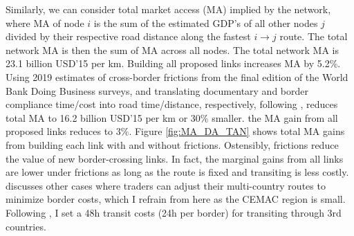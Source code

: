 \documentclass[a4paper]{article}
\begin{document}
Similarly, we can consider total market access (MA) implied by the network, where MA of node $i$ is the sum of the estimated GDP's of all other nodes $j$ divided by their respective road distance along the fastest $i\to j$ route. The total network MA is then the sum of MA across all nodes. The total network MA is 23.1 billion USD'15 per km. Building all proposed links increases MA by 5.2\%. Using 2019 estimates of cross-border frictions from the final edition of the World Bank Doing Business surveys, and translating documentary and border compliance time/cost into road time/distance, respectively, following \citet{krantz2024optimal}, reduces total MA to 16.2 billion USD'15 per km or 30\% smaller. the MA gain from all proposed links reduces to 3\%. Figure \ref{fig:MA_DA_TAN} shows total MA gains from building each link with and without frictions. Ostensibly, frictions reduce the value of new border-crossing links. In fact, the marginal gains from all links are lower under frictions as long as the route is fixed and transiting is less costly.  \citet{krantz2024optimal} discusses other cases where traders can adjust their multi-country routes to minimize border costs, which I refrain from here as the CEMAC region is small. Following \citet{krantz2024optimal}, I set a 48h transit costs (24h per border) for transiting through 3rd countries. %
\end{document}
